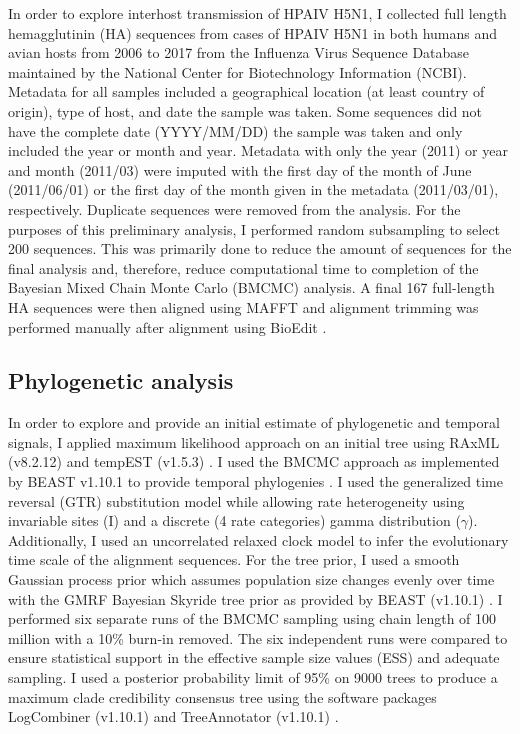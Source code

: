 \documentclass[10pt,english]{article}
\begin{document}
In order to explore interhost transmission of HPAIV H5N1, I collected full length hemagglutinin (HA) sequences from cases of HPAIV H5N1 in both humans and avian hosts from 2006 to 2017 from the Influenza Virus Sequence Database maintained by the National Center for Biotechnology Information (NCBI). Metadata for all samples included a geographical location (at least country of origin), type of host, and date the sample was taken. Some sequences did not have the complete date (YYYY/MM/DD) the sample was taken and only included the year or month and year. Metadata with only the year (2011) or year and month (2011/03) were imputed with the first day of the month of June (2011/06/01) or the first day of the month given in the metadata (2011/03/01), respectively. Duplicate sequences were removed from the analysis. For the purposes of this preliminary analysis, I performed random subsampling to select 200 sequences. This was primarily done to reduce the amount of sequences for the final analysis and, therefore, reduce computational time to completion of the Bayesian Mixed Chain Monte Carlo (BMCMC) analysis. A final 167 full-length HA sequences were then aligned using MAFFT and alignment trimming was performed manually after alignment using BioEdit \autocite{Katoh2013, Hall1999}.

\subsection*{Phylogenetic analysis}

In order to explore and provide an initial estimate of phylogenetic and temporal signals, I applied maximum likelihood approach on an initial tree using RAxML (v8.2.12) and tempEST (v1.5.3) \autocite{Stamatakis2014, Rambaut2016}. I used the BMCMC approach as implemented by BEAST v1.10.1 to provide temporal phylogenies \autocite{Drummond2007}. I used the generalized time reversal (GTR) substitution model while allowing rate heterogeneity using invariable sites (I) and a discrete (4 rate categories) gamma distribution ($\gamma$). Additionally, I used an uncorrelated relaxed clock model to infer the evolutionary time scale of the alignment sequences. For the tree prior, I used a smooth Gaussian process prior which assumes population size changes evenly over time with the GMRF Bayesian Skyride tree prior as provided by BEAST (v1.10.1) \autocite{Drummond2007, Minin2008}. I performed six separate runs of the BMCMC sampling using chain length of 100 million with a 10\% burn-in removed. The six independent runs were compared to ensure statistical support in the effective sample size values (ESS) and adequate sampling. I used a posterior probability limit of 95\% on 9000 trees to produce a maximum clade credibility consensus tree using the software packages LogCombiner (v1.10.1) and TreeAnnotator (v1.10.1) \autocite{Drummond2007}.
\end{document}
